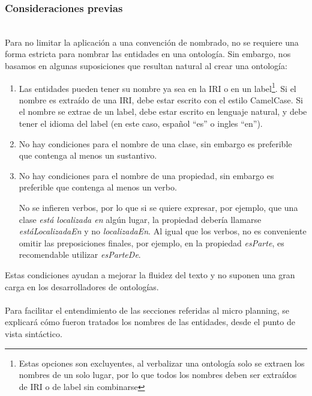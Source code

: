 \subsubsection{Consideraciones previas}
 \\
Para no limitar la aplicación a una convención de nombrado, no se requiere una forma estricta para nombrar las entidades en una ontología. Sin embargo, nos basamos en algunas suposiciones que resultan natural al crear una ontología:
\begin{enumerate}
    \item Las entidades pueden tener su nombre ya sea en la IRI o en un label\footnote{Estas opciones son excluyentes, al verbalizar una ontología solo se extraen los nombres de un solo lugar, por lo que todos los nombres deben ser extraídos de IRI o de label sin combinarse}. Si el nombre es extraído de una IRI, debe estar escrito con el estilo CamelCase. Si el nombre se extrae de un label, debe estar escrito en lenguaje natural, y debe tener el idioma del label (en este caso, español ``es'' o ingles ``en'').
    \item No hay condiciones para el nombre de una clase, sin embargo es preferible que contenga al menos un sustantivo.
    \item No hay condiciones para el nombre de una propiedad, sin embargo es preferible que contenga al menos un verbo. 
    
    No se infieren verbos, por lo que si se quiere expresar, por ejemplo, que una clase \emph{está localizada en} algún lugar, la propiedad debería llamarse \emph{estáLocalizadaEn} y no \emph{localizadaEn}. Al igual que los verbos, no es conveniente omitir las preposiciones finales, por ejemplo, en la propiedad \emph{esParte}, es recomendable utilizar \emph{esParteDe}.
\end{enumerate}

Estas condiciones ayudan a mejorar la fluidez del texto y no suponen una gran carga en los desarrolladores de ontologías.
\\

\\
Para facilitar el entendimiento de las secciones referidas al micro planning, se explicará cómo fueron tratados los nombres de las entidades, desde el punto de vista sintáctico. 


